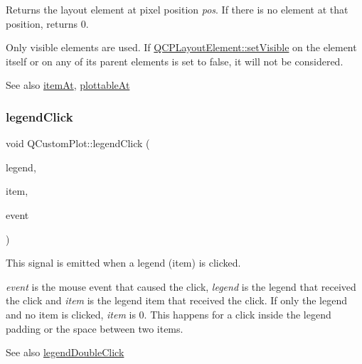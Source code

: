 Returns the layout element at pixel position {\itshape pos}. If there is no element at that position, returns 0.

Only visible elements are used. If \mbox{\hyperlink{class_q_c_p_layerable_a3bed99ddc396b48ce3ebfdc0418744f8}{Q\+C\+P\+Layout\+Element\+::set\+Visible}} on the element itself or on any of its parent elements is set to false, it will not be considered.

\begin{DoxySeeAlso}{See also}
\mbox{\hyperlink{class_q_custom_plot_ac08578e0e6c059c83a8d340ba0038e8e}{item\+At}}, \mbox{\hyperlink{class_q_custom_plot_acddbbd8b16dd633f0d94e5a736fbd8cf}{plottable\+At}} 
\end{DoxySeeAlso}
\mbox{\label{class_q_custom_plot_a79cff0baafbca10a3aaf694d2d3b9ab3}} 
\subsubsection{\texorpdfstring{legend\+Click}{legendClick}}
{\footnotesize\ttfamily void Q\+Custom\+Plot\+::legend\+Click (\begin{DoxyParamCaption}\item[{\mbox{\hyperlink{class_q_c_p_legend}{Q\+C\+P\+Legend}} $\ast$}]{legend,  }\item[{\mbox{\hyperlink{class_q_c_p_abstract_legend_item}{Q\+C\+P\+Abstract\+Legend\+Item}} $\ast$}]{item,  }\item[{Q\+Mouse\+Event $\ast$}]{event }\end{DoxyParamCaption})\hspace{0.3cm}{\ttfamily [signal]}}

This signal is emitted when a legend (item) is clicked.

{\itshape event} is the mouse event that caused the click, {\itshape legend} is the legend that received the click and {\itshape item} is the legend item that received the click. If only the legend and no item is clicked, {\itshape item} is 0. This happens for a click inside the legend padding or the space between two items.

\begin{DoxySeeAlso}{See also}
\mbox{\hyperlink{class_q_custom_plot_a0250f835c044521df1619b132288bca7}{legend\+Double\+Click}} 
\end{DoxySeeAlso}
\mbox{\label{class_q_custom_plot_a0250f835c044521df1619b132288bca7}} 

